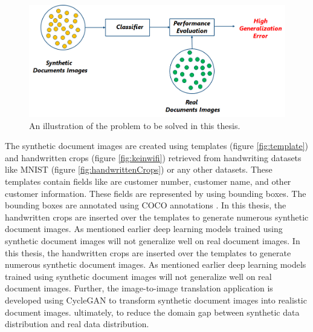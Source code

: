 \begin{figure}[H]
        \begin{center}
	    \includegraphics[scale=0.60]{images/Introduction/Problem.png}
	    \caption[An illustration of the problem to be solved in this thesis.]{An illustration of the problem to be solved in this thesis.}
	    \label{fig:Problem}
	    \end{center}
\end{figure}


The synthetic document images are created using templates (figure \ref{fig:template}) and handwritten crops (figure \ref{fig:keinwifi}) retrieved from handwriting datasets like \ac{MNIST} (figure \ref{fig:handwrittenCrops}) or any other datasets. These templates contain fields like are customer number, customer name, and other customer information. These fields are represented by using bounding boxes. The bounding boxes are annotated using \ac{COCO} annotations \cite{10.1007/978-3-319-10602-1_48}. In this thesis, the handwritten crops are inserted over the templates to generate numerous synthetic document images. As mentioned earlier deep learning models trained using synthetic document images will not generalize well on real document images. In this thesis, the handwritten crops are inserted over the templates to generate numerous synthetic document images. As mentioned earlier deep learning models trained using synthetic document images will not generalize well on real document images. Further, the image-to-image translation application is developed using \ac{CycleGAN} to transform synthetic document images into realistic document images. ultimately, to reduce the domain gap between synthetic data distribution and real data distribution. 


